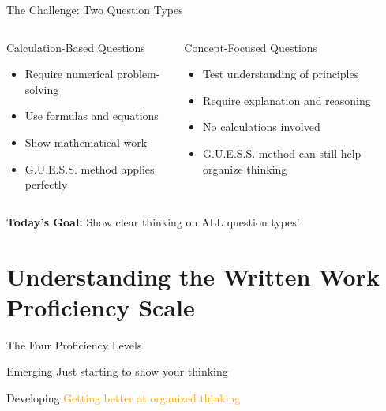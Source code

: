 \documentclass{beamer}
\begin{document}
\begin{frame}{The Challenge: Two Question Types}
\begin{columns}
\begin{column}{0.5\textwidth}
\begin{block}{Calculation-Based Questions}
\begin{itemize}
\item Require numerical problem-solving \pause
\item Use formulas and equations \pause
\item Show mathematical work \pause
\item \textcolor{ds9blue}{G.U.E.S.S. method applies perfectly}
\end{itemize}
\end{block}
\end{column} \pause
\begin{column}{0.5\textwidth}
\begin{block}{Concept-Focused Questions}
\begin{itemize}
\item Test understanding of principles \pause
\item Require explanation and reasoning \pause
\item No calculations involved \pause
\item \textcolor{ds9blue}{G.U.E.S.S. method can still help organize thinking}
\end{itemize}
\end{block}
\end{column}
\end{columns}

\pause
\vspace{0.5cm}
\textbf{Today's Goal:} Show clear thinking on ALL question types!
\end{frame}



\section{Understanding the Written Work Proficiency Scale}

\begin{frame}{The Four Proficiency Levels}
\begin{block}{Emerging}
\textcolor{ds9red}{Just starting to show your thinking}
\end{block}

\pause
\begin{block}{Developing}
\textcolor{orange}{Getting better at organized thinking}
\end{block}
\end{frame}
\end{document}
